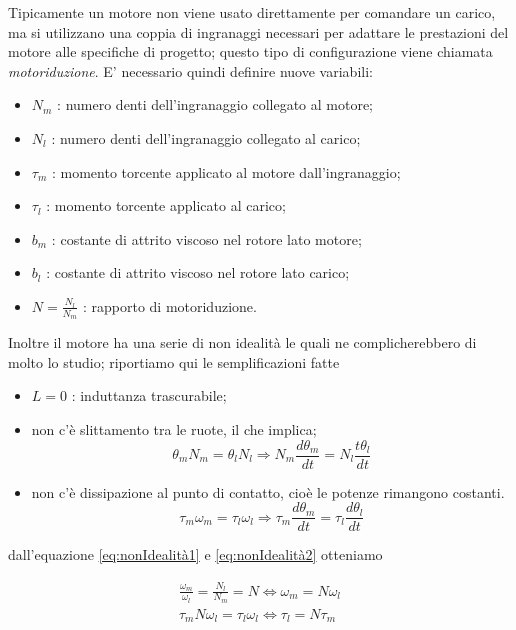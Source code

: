 		\noindent Tipicamente un motore non viene usato direttamente per comandare un carico, ma si utilizzano una coppia di ingranaggi necessari per adattare le prestazioni del motore alle specifiche di progetto; questo tipo di configurazione viene chiamata \textit{motoriduzione}. E' necessario quindi definire nuove variabili:
	
		\begin{itemize}
			\item $N_m$ : numero denti dell'ingranaggio collegato al motore;
			\item $N_l$ : numero denti dell'ingranaggio collegato al carico;
			\item $\tau_m$ : momento torcente applicato al motore dall'ingranaggio;
			\item $\tau_l$ : momento torcente applicato al carico;
			\item $b_m$ : costante di attrito viscoso nel rotore lato motore;
			\item $b_l$ : costante di attrito viscoso nel rotore lato carico;
			\item $N = \frac{N_l}{N_m}$ : rapporto di motoriduzione.
		\end{itemize}  
	
		\noindent Inoltre il motore ha una serie di non idealità le quali ne complicherebbero di molto lo studio; riportiamo qui le semplificazioni fatte
	
		\begin{itemize}
			\item $L = 0$ : induttanza trascurabile;
			\item non c'è slittamento tra le ruote, il che implica;
			\begin{equation}
				\theta_mN_m = \theta_lN_l \Longrightarrow N_m\frac{d\theta_m}{dt}=N_l\frac{t\theta_l}{dt}
				\label{eq:nonIdealità1}
			\end{equation}
			\item non c'è dissipazione al punto di contatto, cioè le potenze rimangono costanti.
			\begin{equation}
				\tau_m\omega_m=\tau_l\omega_l \Longrightarrow \tau_m\frac{d\theta_m}{dt}=\tau_l\frac{d\theta_l}{dt}
				\label{eq:nonIdealità2}  
			\end{equation}
		\end{itemize}
	
		\noindent dall'equazione \ref{eq:nonIdealità1} e \ref{eq:nonIdealità2} otteniamo
	
		\begin{gather}
			\frac{\omega_m}{\omega_l}=\frac{N_l}{N_m}=N \Longleftrightarrow \omega_m=N\omega_l \\
			\tau_mN\omega_l=\tau_l\omega_l \Longleftrightarrow \tau_l=N\tau_m
		\label{gat:comp}
		\end{gather}
	
